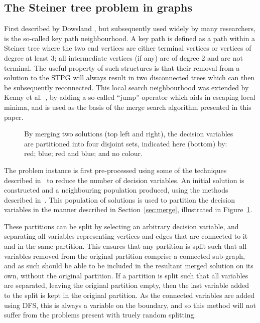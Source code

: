 \documentclass[journal]{IEEEtran}
\begin{document}
\subsection{The Steiner tree problem in graphs}


First described by Dowsland \cite{kp:dowsland}, but subsequently used widely by many researchers, is the so-called key path neighbourhood. A key path is defined as a path within a Steiner tree where the two end vertices are either terminal vertices or vertices of degree at least 3; all intermediate  vertices (if any) are of degree 2 and are not terminal. The useful property of such structures is that their removal from a solution to the STPG will always result in two disconnected trees which can then be subsequently reconnected. This local search neighbourhood was extended by Kenny et al.~\cite{gecco16}, by adding a so-called ``jump'' operator which aids in escaping local minima, and is used as the basis of the merge search algorithm presented in this paper.

\begin{figure}[h]
\centering
{}
    \caption[Partitioning variables by merging solutions]{By merging two solutions (top left and right), the decision variables are partitioned into four disjoint sets, indicated here (bottom) by: red; blue; red and blue; and no colour.}\label{fig:stpg-partition} 
\end{figure}

The problem instance is first pre-processed using some of the techniques described in~\cite{pp:duin,pp:uchoa,stpg-reduce} to reduce the number of decision variables. An initial solution is constructed and a neighbouring population produced, using the methods described in~\cite{gecco16}. This population of solutions is used to partition the decision variables in the manner described in Section~\ref{sec:merge}, illustrated in Figure~\ref{fig:stpg-partition}.


These partitions can be split by selecting an arbitrary decision variable, and separating all variables representing vertices and edges that are connected to it and in the same partition. This ensures that any partition is split such that all variables removed from the original partition comprise a connected sub-graph, and as such should be able to be included in the resultant merged solution on its own, without the original partition. If a partition is split such that all variables are separated, leaving the original partition empty, then the last variable added to the split is kept in the original partition. As the connected variables are added using DFS, this is always a variable on the boundary, and so this method will not suffer from the problems present with truely random splitting. 
\end{document}
